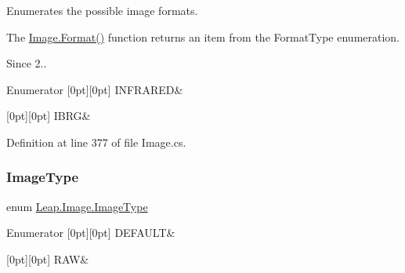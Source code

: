 Enumerates the possible image formats. 

The \mbox{\hyperlink{class_leap_1_1_image_a87defbae65a250428b3b938b9ff7ae22}{Image.\+Format()}} function returns an item from the Format\+Type enumeration. \begin{DoxySince}{Since}
2.. 
\end{DoxySince}
\begin{DoxyEnumFields}{Enumerator}
[0pt][0pt]{}\mbox{\label{class_leap_1_1_image_acefbe5d3803afc9f433a6e3856d242d1aff92c9d80b80d38c9022de2405a9e80d}} 
I\+N\+F\+R\+A\+R\+ED&\\
\hline

[0pt][0pt]{}\mbox{\label{class_leap_1_1_image_acefbe5d3803afc9f433a6e3856d242d1a4c7dacc91ca63ccea661d62e6a4faad1}} 
I\+B\+RG&\\
\hline

\end{DoxyEnumFields}


Definition at line 377 of file Image.\+cs.

\mbox{\label{class_leap_1_1_image_a876a507d46b2dfce38d703a05cc4377f}} 
\subsubsection{\texorpdfstring{ImageType}{ImageType}}
{\footnotesize\ttfamily enum \mbox{\hyperlink{class_leap_1_1_image_a876a507d46b2dfce38d703a05cc4377f}{Leap.\+Image.\+Image\+Type}}\hspace{0.3cm}{\ttfamily [strong]}}

\begin{DoxyEnumFields}{Enumerator}
[0pt][0pt]{}\mbox{\label{class_leap_1_1_image_a876a507d46b2dfce38d703a05cc4377fa5b39c8b553c821e7cddc6da64b5bd2ee}} 
D\+E\+F\+A\+U\+LT&\\
\hline

[0pt][0pt]{}\mbox{\label{class_leap_1_1_image_a876a507d46b2dfce38d703a05cc4377fa633d6abff0a3fc22404347728d195059}} 
R\+AW&\\
\hline

\end{DoxyEnumFields}


